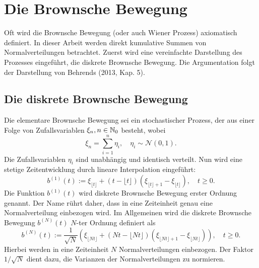 \section{Die Brownsche Bewegung}

Oft wird die Brownsche Bewegung (oder auch Wiener Prozess) axiomatisch definiert. In dieser Arbeit werden 
direkt kumulative Summen von Normalverteilungen betrachtet. Zuerst wird eine vereinfachte Darstellung des Prozesses eingeführt, 
die diskrete Brownsche Bewegung. Die Argumentation folgt der Darstellung von Behrends \cite{behrends} (2013, Kap. 5).

\subsection{Die diskrete Brownsche Bewegung}

\begin{defi}
Die elementare Brownsche Bewegung sei ein stochastischer Prozess, 
der aus einer Folge von Zufallsvariablen $\xi_n, n \in \Bbb N_0$ besteht, wobei
$$\xi_n = \sum_{i=1}^n \eta_i, \quad \eta_i \sim \mathcal N(0,1).$$
Die Zufallsvariablen $\eta_i$ sind unabhängig und identisch verteilt.
Nun wird eine stetige Zeitentwicklung durch lineare Interpolation eingeführt:
$$b^{(1)}(t) := \xi_{\lfloor t \rfloor} + (t - \lfloor t \rfloor)(\xi_{\lfloor t \rfloor + 1} - \xi_{\lfloor t \rfloor}), \quad t \geq 0.$$
Die Funktion $b^{(1)}(t)$ wird diskrete Brownsche Bewegung erster Ordnung genannt.
Der Name rührt daher, dass in eine Zeiteinheit genau eine Normalverteilung einbezogen wird.
Im Allgemeinen wird die diskrete Brownsche Bewegung $b^{(N)}(t)$ $N$-ter Ordnung definiert als
$$b^{(N)}(t) := \frac{1}{\sqrt{N}} \left ( \xi_{\lfloor Nt \rfloor} + (Nt - \lfloor Nt \rfloor)(\xi_{\lfloor Nt \rfloor + 1} - \xi_{\lfloor Nt \rfloor}) \right ), \quad t \geq 0.$$
Hierbei werden in eine Zeiteinheit $N$ Normalverteilungen einbezogen. Der Faktor $1/\sqrt{N}$ dient dazu, die Varianzen der Normalverteilungen zu normieren.

\end{defi}

